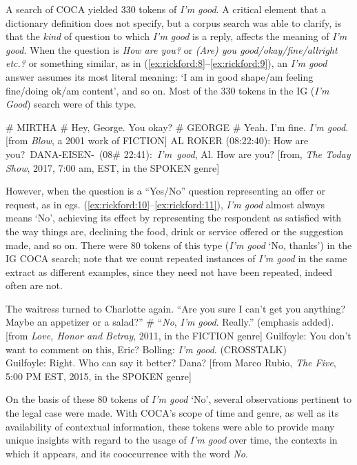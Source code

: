 \documentclass[output=paper,colorlinks,citecolor=brown]{langscibook}
\begin{document}
A search of COCA yielded 330 tokens of \textit{I'm good}. A critical element that a dictionary definition does not specify, but a corpus search was able to clarify, is that the \textit{kind} of question to which \textit{I'm good} is a reply, affects the meaning of \textit{I'm good}.  When the question is \textit{How are you?} or \textit{(Are) you good\slash okay\slash fine\slash allright etc.?} or something similar, as in (\ref{ex:rickford:8}--\ref{ex:rickford:9}), an \textit{I'm good} answer assumes its most literal meaning:  `I am in good shape/am feeling fine/doing ok/am content', and so on. Most of the 330 tokens in the IG (\textit{I’m Good}) search were of this type.

\ea%
    \label{ex:rickford:8}
         \# MIRTHA \# Hey, George. You okay? \# GEORGE \# Yeah. I'm fine. \textit{I'm good}. [from \textit{Blow}, a 2001 work of FICTION]
\ex%
    \label{ex:rickford:9}
  AL ROKER (08:22:40): How are you?~DANA-EISEN-~(08\# 22:41):~\textit{I'm~good}, Al. How are you? [from, \textit{The Today Show}, 2017, 7:00 am, EST, in the SPOKEN genre]  
    \z

However, when the question is a “Yes/No” question representing an offer or request, as in egs. (\ref{ex:rickford:10}--\ref{ex:rickford:11}), \textit{I'm good} almost always means `No', achieving its effect by representing the respondent as satisfied with the way things are, declining the food, drink or service offered or the suggestion made, and so on.  There were 80 tokens of this type (\textit{I'm good} `No, thanks') in the IG COCA search; note that we count repeated instances of \textit{I'm good} in the same extract as different examples, since they need not have been repeated, indeed often are not.

\ea%
    \label{ex:rickford:10}
The waitress turned to Charlotte again. “Are you sure I can't get you anything? Maybe an appetizer or a salad?” \# “\textit{\textit{No}}, \textit{I'm} \textit{good}. Really.” (emphasis added). [from \textit{Love, Honor and Betray}, 2011, in the FICTION genre]
\ex %
    \label{ex:rickford:11}
Guilfoyle: You don't want to comment on this, Eric?  Bolling: \textit{I'm} \textit{good}. (CROSSTALK)\\
Guilfoyle: Right. Who can say it better? Dana?  [from Marco Rubio, \textit{The Five}, 5:00 PM EST, 2015, in the SPOKEN genre]
  \z

         
On the basis of these 80 tokens of \textit{I'm good} `No', several observations pertinent to the legal case were made. With COCA’s scope of time and genre, as well as its availability of contextual information, these tokens were able to provide many unique insights with regard to the usage of \textit{I'm good} over time, the contexts in which it appears, and its cooccurrence with the word \textit{No}.
\end{document}
